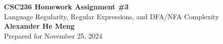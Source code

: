 \begin{titlepage}
    \null %
    \vfill
    \begin{center}
        {\fontsize{40}{48}\selectfont \bfseries CSC236 Homework Assignment \#3}
        \vspace{20pt} \\
        {\LARGE Language Regularity, Regular Expressions, and DFA/NFA Complexity} \\
        \vspace{20pt}
        \textbf{Alexander He Meng}
        \vspace{8pt}
        \\ Prepared for November 25, 2024
    \end{center}
    \vfill
\end{titlepage}
